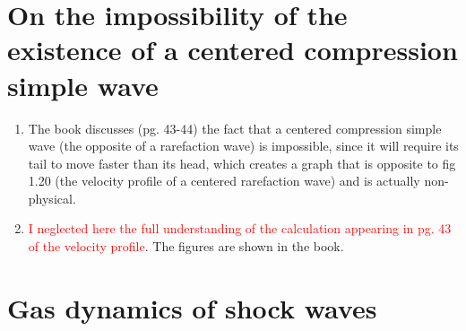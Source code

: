 ﻿\documentclass[11pt]{article}
\begin{document}
\section{On the impossibility of the existence of a centered compression simple wave}
\begin{enumerate}
  \item The book discusses (pg. 43-44) the fact that a centered compression simple wave (the opposite of a rarefaction wave) is impossible, since it will require its tail to move faster than its head, which creates a graph that is opposite to fig 1.20 (the velocity profile of a centered rarefaction wave) and is actually non-physical.
  \item \textcolor{red}{I neglected here the full understanding of the calculation appearing in pg. 43 of the velocity profile}. The figures are shown in the book.
\end{enumerate}
\section{Gas dynamics of shock waves}
\end{document}
